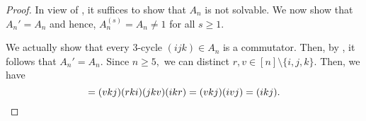 \SnAnnotsolvable*\label{thm:SnAnnotsolvable2}
\begin{flushright}\hyperref[thm:SnAnnotsolvable]{\upsym}\end{flushright}
\begin{proof}
    In view of , it suffices to show that $A_n$ is not solvable. We now show that $A_n' = A_n$ and hence, $A_n^{(s)} = A_n \neq 1$ for all $s \ge 1.$

    We actually show that every $3$-cycle $(i j k) \in A_n$ is a commutator. Then, by , it follows that $A_n' = A_n.$ Since $n \ge 5,$ we can distinct $r, v \in [n] \setminus \{i, j, k\}.$ Then, we have
    \begin{equation*} 
        [(jkv), (ikr)] = (vkj)(rki)(jkv)(ikr) = (vkj)(ivj) = (ikj). \qedhere
    \end{equation*}
\end{proof}

